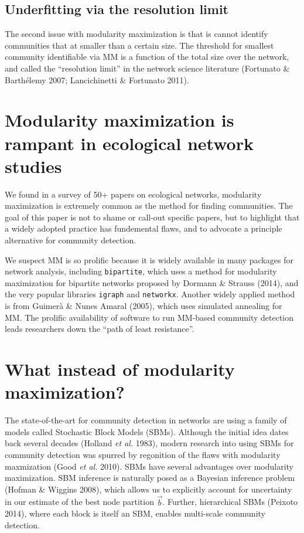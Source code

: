 \documentclass[
]{article}
\begin{document}
\hypertarget{underfitting-via-the-resolution-limit}{%
\subsection{Underfitting via the resolution
limit}\label{underfitting-via-the-resolution-limit}}

The second issue with modularity maximization is that is cannot identify
communities that at smaller than a certain size. The threshold for
smallest community identifiable via MM is a function of the total size
over the network, and called the ``resolution limit'' in the network
science literature (Fortunato \& Barthélemy 2007; Lancichinetti \&
Fortunato 2011).

\hypertarget{modularity-maximization-is-rampant-in-ecological-network-studies}{%
\section{Modularity maximization is rampant in ecological network
studies}\label{modularity-maximization-is-rampant-in-ecological-network-studies}}

We found in a survey of 50+ papers on ecological networks, modularity
maximization is extremely common as the method for finding communities.
The goal of this paper is not to shame or call-out specific papers, but
to highlight that a widely adopted practice has fundemental flaws, and
to advocate a principle alternative for community detection.

We suspect MM is so prolific because it is widely available in many
packages for network analysis, including \texttt{bipartite}, which uses
a method for modularity maximization for bipartite networks proposed by
Dormann \& Strauss (2014), and the very popular libraries
\texttt{igraph} and \texttt{networkx}. Another widely applied method is
from Guimerà \& Nunes Amaral (2005), which uses simulated annealing for
MM. The prolific availability of software to run MM-based community
detection leads researchers down the ``path of least resistance''.

\hypertarget{what-instead-of-modularity-maximization}{%
\section{What instead of modularity
maximization?}\label{what-instead-of-modularity-maximization}}

The state-of-the-art for community detection in networks are using a
family of models called Stochastic Block Models (SBMs). Although the
initial idea dates back several decades (Holland \emph{et al.} 1983),
modern research into using SBMs for community detection was spurred by
regonition of the flaws with modularity maxmization (Good \emph{et al.}
2010). SBMs have several advantages over modularity maximization. SBM
inference is naturally posed as a Bayesian inference problem (Hofman \&
Wiggins 2008), which allows us to explicitly account for uncertainty in
our estimate of the best node partition \(\vec{b}\). Further,
hierarchical SBMs (Peixoto 2014), where each block is itself an SBM,
enables multi-scale community detection.
\end{document}
